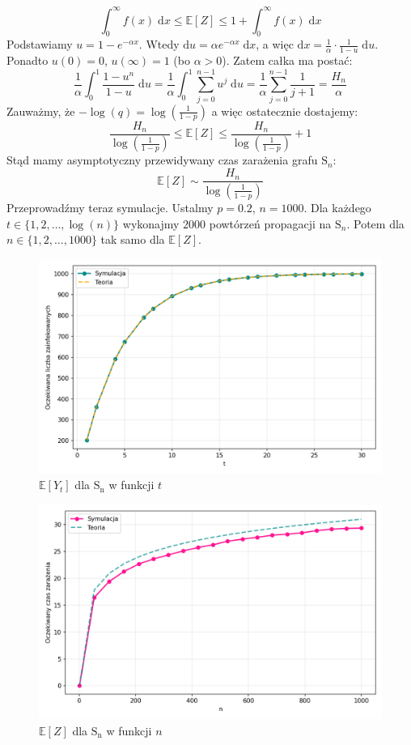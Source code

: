 \[
    \int_{0}^{\infty} f(x) \; \mathrm{d}x \le \mathbb{E}[Z] \le  1 + \int_{0}^{\infty} f(x) \; \mathrm{d}x
\]
Podstawiamy $u = 1 - e^{-\alpha x}$. Wtedy $\mathrm{d}u = \alpha e^{-\alpha x} \; \mathrm{d}x$, 
a więc $\mathrm{d}x = \frac{1}{\alpha}\cdot\frac{1}{1-u} \; \mathrm{d}u$. 
Ponadto $u(0) = 0$, $u(\infty) = 1$ (bo $\alpha > 0$). 
Zatem całka ma postać:
\[
 \frac{1}{\alpha} \int_{0}^{1} \frac{1 - u^n}{1 - u} \; \mathrm{d}u
= \frac{1}{\alpha} \int_{0}^{1} \sum_{j=0}^{n-1} u^j \; \mathrm{d}u
= \frac{1}{\alpha} \sum_{j=0}^{n-1} \frac{1}{j+1}
= \frac{H_n}{\alpha}
\]
Zauważmy, że $-\log(q)=\log(\frac{1}{1-p})$ a więc ostatecznie dostajemy:
\[
    \frac{H_n}{\log(\frac{1}{1-p})} \le \mathbb{E}[Z] \le \frac{H_n}{\log(\frac{1}{1-p})} + 1
\]
Stąd mamy asymptotyczny przewidywany czas zarażenia grafu $\mathrm{S}_n$:
\[
    \mathbb{E}[Z] \sim \frac{H_n}{\log(\frac{1}{1-p})}
\]
Przeprowadźmy teraz symulacje. Ustalmy $p=0.2$, $n=1000$. Dla każdego $t\in\{1, 2, \dots, \log(n)\}$ wykonajmy $2000$ powtórzeń propagacji na $\mathrm{S}_n$. Potem dla $n\in\{1,2,\dots,1000\}$ tak samo dla $\mathbb{E}[Z]$. 
\begin{figure}[h!]
    \centering
    \includegraphics[width=1\textwidth]{../img/star/final_infection_expectations.png}
    \caption{$\mathbb{E}[Y_t]$ dla $\mathrm{S_n}$ w funkcji $t$}
\end{figure}
\begin{figure}[h!]
    \centering
    \includegraphics[width=1\textwidth]{../img/star/full_infection_expectation.png}
    \caption{$\mathbb{E}[Z]$ dla $\mathrm{S_n}$ w funkcji $n$}
\end{figure}
